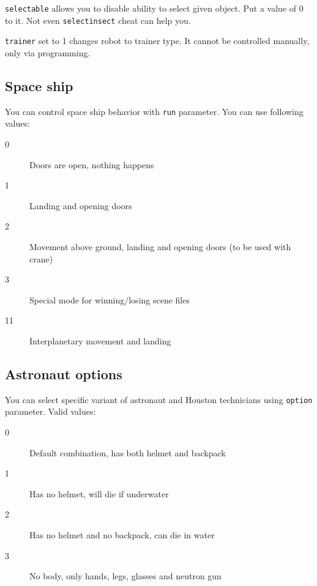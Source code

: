 \texttt{selectable} allows you to disable ability to select given object. Put a value of 0 to it. Not even \texttt{selectinsect} cheat can help you.

\texttt{trainer} set to 1 changes robot to trainer type. It cannot be controlled manually, only via programming.



\subsection{Space ship}

You can control space ship behavior with \texttt{run} parameter. You can use following values:

\begin{description}
    \item[0] Doors are open, nothing happens
    \item[1] Landing and opening doors
    \item[2] Movement above ground, landing and opening doors (to be used with crane)
    \item[3] Special mode for winning/losing scene files
    \item[11] Interplanetary movement and landing
\end{description}


\subsection{Astronaut options}

You can select specific variant of astronaut and Houston technicians using \texttt{option} parameter. Valid values:

\begin{description}
    \item[0] Default combination, has both helmet and backpack
    \item[1] Has no helmet, will die if underwater
    \item[2] Has no helmet and no backpack, can die in water
    \item[3] No body, only hands, legs, glasses and neutron gun
\end{description}


